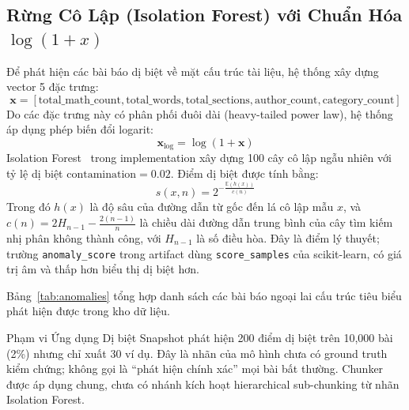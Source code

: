 \subsection{Rừng Cô Lập (Isolation Forest) với Chuẩn Hóa $\log(1+x)$}
Để phát hiện các bài báo dị biệt về mặt cấu trúc tài liệu, hệ thống xây dựng vector 5 đặc trưng:
\begin{equation}
  \mathbf{x} = [\text{total\_math\_count}, \text{total\_words}, \text{total\_sections}, \text{author\_count}, \text{category\_count}]
\end{equation}
Do các đặc trưng này có phân phối đuôi dài (heavy-tailed power law), hệ thống áp dụng phép biến đổi logarit:
\begin{equation}
  \mathbf{x}_{\text{log}} = \log(1 + \mathbf{x})
\end{equation}
Isolation Forest~\cite{liu2008isolation} trong implementation xây dựng 100 cây cô lập ngẫu nhiên với tỷ lệ dị biệt $\text{contamination} = 0.02$. Điểm dị biệt được tính bằng:
\begin{equation}
  s(x, n) = 2^{-\frac{\mathbb{E}(h(x))}{c(n)}}
\end{equation}
Trong đó $h(x)$ là độ sâu của đường dẫn từ gốc đến lá cô lập mẫu $x$, và $c(n) = 2H_{n-1} - \frac{2(n-1)}{n}$ là chiều dài đường dẫn trung bình của cây tìm kiếm nhị phân không thành công, với $H_{n-1}$ là số điều hòa. Đây là điểm lý thuyết; trường \texttt{anomaly\_score} trong artifact dùng \texttt{score\_samples} của scikit-learn, có giá trị âm và thấp hơn biểu thị dị biệt hơn.

Bảng~\ref{tab:anomalies} tổng hợp danh sách các bài báo ngoại lai cấu trúc tiêu biểu phát hiện được trong kho dữ liệu.



\begin{calloutbox}{Phạm vi Ứng dụng Dị biệt}
Snapshot phát hiện 200 điểm dị biệt trên 10,000 bài (2\%) nhưng chỉ xuất 30 ví dụ. Đây là nhãn của mô hình chưa có ground truth kiểm chứng; không gọi là ``phát hiện chính xác'' mọi bài bất thường. Chunker được áp dụng chung, chưa có nhánh kích hoạt hierarchical sub-chunking từ nhãn Isolation Forest.
\end{calloutbox}

